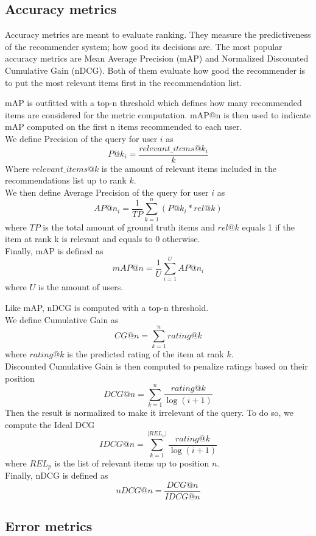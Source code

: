 \subsection{Accuracy metrics}

Accuracy metrics are meant to evaluate ranking. They measure the predictiveness of the recommender system; how good its decisions are. The most popular accuracy metrics are Mean Average Precision (mAP) and Normalized Discounted Cumulative Gain (nDCG). Both of them evaluate how good the recommender is to put the most relevant items first in the recommendation list.\par
mAP is outfitted with a top-n threshold which defines how many recommended items are considered for the metric computation. mAP@n is then used to indicate mAP computed on the first n items recommended to each user.\\
We define Precision of the query for user $i$ as
\[ P@k_i = \frac{relevant\_items@k_i}{k} \]
Where $relevant\_items@k$ is the amount of relevant items included in the recommendations list up to rank $k$.\\
We then define Average Precision of the query for user $i$ as
\[ AP@n_i = \frac{1}{TP} \sum_{k=1}^{n} (P@k_i * rel@k) \]
where $TP$ is the total amount of ground truth items and $rel@k$ equals 1 if the item at rank k is relevant and equals to 0 otherwise.\\
Finally, mAP is defined as
\[ mAP@n = \frac{1}{U} \sum_{i=1}^{U} AP@n_i \]
where $U$ is the amount of users.\par
Like mAP, nDCG is computed with a top-n threshold.\\
We define Cumulative Gain as
\[ CG@n = \sum_{k=1}^{n} rating@k \]
where $rating@k$ is the predicted rating of the item at rank $k$.\\
Discounted Cumulative Gain is then computed to penalize ratings based on their position
\[ DCG@n = \sum_{k=1}^{n} \frac{rating@k}{\log(i+1)} \]
Then the result is normalized to make it irrelevant of the query. To do so, we compute the Ideal DCG
\[ IDCG@n = \sum_{k=1}^{|REL_n|} \frac{rating@k}{\log(i+1)} \]
where $REL_p$ is the list of relevant items up to position $n$.\\
Finally, nDCG is defined as
\[ nDCG@n = \frac{DCG@n}{IDCG@n} \]


\subsection{Error metrics}

